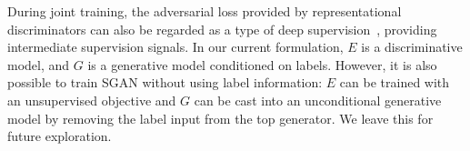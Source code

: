 \documentclass[10pt,twocolumn,letterpaper]{article}
\begin{document}



During joint training, the adversarial loss provided by representational discriminators can also be regarded as a type of deep supervision~\cite{lee2015deeply}, providing intermediate supervision signals. In our current formulation, $E$ is a discriminative model, and $G$ is a generative model conditioned on labels. However, it is also possible to train SGAN without using label information: $E$ can be trained with an unsupervised objective and $G$ can be cast into an unconditional generative model by removing the label input from the top generator. We leave this for future exploration.


\end{document}
